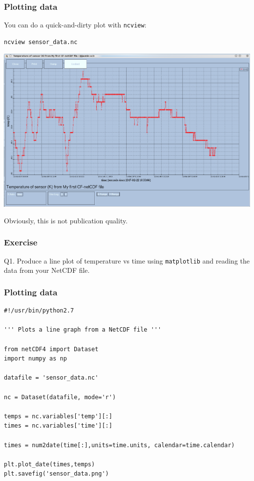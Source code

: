 \documentclass[aspectratio=1610,9pt]{beamer} %
\begin{document}
\begin{frame}
\frametitle{Plotting data}

You can do a quick-and-dirty plot with \texttt{ncview}:

\texttt{ncview sensor\_data.nc}

\includegraphics[width=\textwidth]{sensor-data-ncview.png}

Obviously, this is not publication quality.

\subsubsection{Exercise}

Q1. Produce a line plot of temperature vs time using \texttt{matplotlib}
and reading the data from your NetCDF file.

\end{frame}
\begin{frame}[fragile]
\frametitle{Plotting data}

\begin{verbatim}
#!/usr/bin/python2.7

''' Plots a line graph from a NetCDF file '''

from netCDF4 import Dataset
import numpy as np

datafile = 'sensor_data.nc'

nc = Dataset(datafile, mode='r')

temps = nc.variables['temp'][:]
times = nc.variables['time'][:]

times = num2date(time[:],units=time.units, calendar=time.calendar)

plt.plot_date(times,temps)
plt.savefig('sensor_data.png')
\end{verbatim}

\end{frame}
\end{document}
